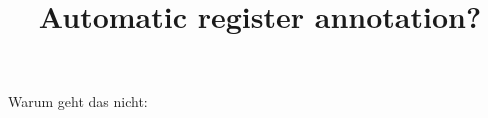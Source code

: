 \documentclass[11pt]{article}
\title{Automatic register annotation?}
\begin{document}
\maketitle







Warum geht das nicht: \cite{Biber1988} 
%
 \printbibliography
\end{document}
